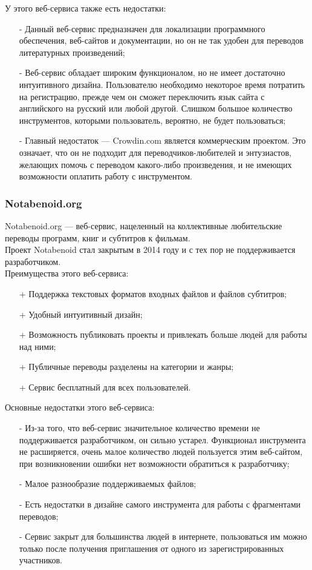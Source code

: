 \documentclass[a4paper,12pt]{article}
\begin{document}
У этого веб-сервиса также есть недостатки:
\begin{itemize}
	\item[-] Данный веб-сервис предназначен для локализации программного обеспечения, веб-сайтов и документации, но он не так удобен для переводов литературных произведений;
	\item[-] Веб-сервис обладает широким функционалом, но не имеет достаточно интуитивного дизайна. Пользователю необходимо некоторое время потратить на регистрацию, прежде чем он сможет переключить язык сайта с английского на русский или любой другой. Слишком большое количество инструментов, которыми пользователь, вероятно, не будет пользоваться;
	\item[-] Главный недостаток — Crowdin.com является коммерческим проектом. Это означает, что он не подходит для переводчиков-любителей и энтузиастов, желающих помочь с переводом какого-либо произведения, и не имеющих возможности оплатить работу с инструментом.
\end{itemize}

\subsubsection{Notabenoid.org}

Notabenoid.org — веб-сервис, нацеленный на коллективные любительские переводы программ, книг и субтитров к фильмам. \cite{website:nota}\\
Проект Notabenoid стал закрытым в 2014 году и с тех пор не поддерживается разработчиком.\\

Преимущества этого веб-сервиса:
\begin{itemize}
	\item[+] Поддержка текстовых форматов входных файлов и файлов субтитров;
	\item[+] Удобный интуитивный дизайн;
	\item[+] Возможность публиковать проекты и привлекать больше людей для работы над ними;
	\item[+] Публичные переводы разделены на категории и жанры;
	\item[+] Сервис бесплатный для всех пользователей.
\end{itemize}

Основные недостатки этого веб-сервиса:
\begin{itemize}
	\item[-] Из-за того, что веб-сервис значительное количество времени не поддерживается разработчиком, он сильно устарел. Функционал инструмента не расширяется, очень малое количество людей пользуется этим веб-сайтом, при возникновении ошибки нет возможности обратиться к разработчику;
	\item[-] Малое разнообразие поддерживаемых файлов;
	\item[-] Есть недостатки в дизайне самого инструмента для работы с фрагментами переводов;
	\item[-] Сервис закрыт для большинства людей в интернете, пользоваться им можно только после получения приглашения от одного из зарегистрированных участников.
\end{itemize}
\end{document}
